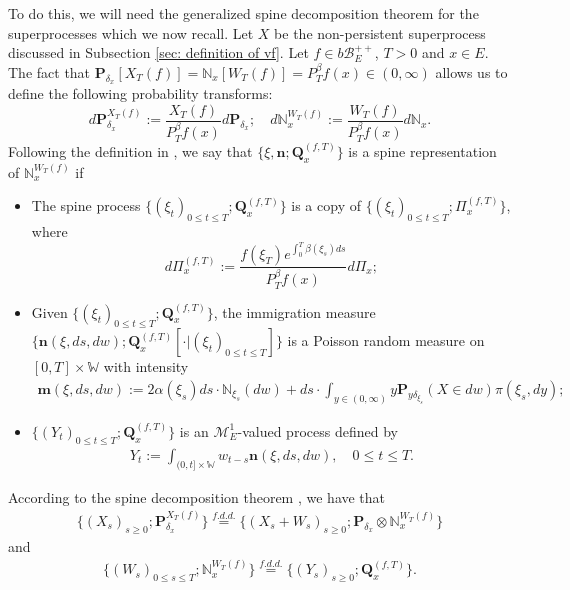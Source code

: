 \documentclass[12pt]{amsart}
\theoremstyle{plain}
\theoremstyle{definition}
\numberwithin{equation}{section}
\begin{document}
    To do this, we will need the generalized spine decomposition theorem for the superprocesses \cite{RenSongSun2017Spine} which we now recall.
    Let $X$ be the non-persistent superprocess discussed in Subsection \ref{sec: definition of vf}.
    Let $f\in b\mathscr B_E^{++}$, $T >0$ and $x\in E$.
    The fact that $\mathbf P_{\delta_x}[X_T(f)] = \mathbb N_x[W_T(f)] = P^\beta_T f(x) \in (0,\infty)$ allows us to define the following probability transforms:
\begin{equation}
    d\mathbf P_{\delta_x}^{X_T(f)}
    := \frac{X_T(f)}{P_T^\beta f(x)} d\mathbf P_{\delta_x};
    \quad d\mathbb N_x^{W_T(f)}
    :=  \frac{W_T(f)}{P_T^\beta f(x)} d\mathbb N_x.
\end{equation}
    Following the definition in \cite{RenSongSun2017Spine}, we say that $\{\xi, \mathbf n;\mathbf Q_{x}^{(f,T)}\}$ is a spine representation of $\mathbb N_x^{W_T(f)}$ if
\begin{itemize}
\item
    The spine process $\{(\xi_t)_{0\leq t\leq T}; \mathbf Q^{(f,T)}_x\}$ is a copy of $\{(\xi_t)_{0\leq t\leq T}; \Pi^{(f,T)}_{x}\}$,
    where
\begin{equation}
    d\Pi_x^{(f,T)} := \frac{f(\xi_T)e^{\int_0^T \beta(\xi_s)ds}}{P^\beta_T f(x)} d \Pi_x;
\end{equation}
\item
    Given $\{(\xi_t)_{0\leq t\leq T}; \mathbf Q^{(f,T)}_x\}$, the immigration measure $\{\mathbf n(\xi,ds,dw); \mathbf Q^{(f,T)}_x[\cdot |(\xi_t)_{0\leq t\leq T}]\}$ is a Poisson random measure on $[0,T] \times \mathbb W$ with intensity
\begin{align}
\label{eq: conditional intensity}
    \mathbf m(\xi,ds,dw)
    := 2 \alpha(\xi_s) ds \cdot \mathbb N_{\xi_s}(dw) + ds \cdot \int_{y\in (0,\infty)} y \mathbf P_{y\delta_{\xi_s}}(X\in dw) \pi(\xi_s,dy);
\end{align}
\item
    $\{(Y_t)_{0\leq t\leq T}; \mathbf Q^{(f,T)}_x\}$ is an $\mathcal M^1_E$-valued process defined by
\begin{align}
    Y_t
    := \int_{(0,t] \times \mathbb W} w_{t-s} \mathbf n(\xi,ds,dw),
    \quad 0 \leq t\leq T.
\end{align}
\end{itemize}
    According to the spine decomposition theorem \cite{RenSongSun2017Spine}, we have that
\begin{align}
\label{eq: Spine decomposition 1}
    \{(X_s)_{s \geq 0};\mathbf P_{\delta_x}^{X_T(f)}\}
    \overset{f.d.d.}{=} \{(X_s + W_s)_{s \geq 0};\mathbf P_{\delta_x} \otimes \mathbb N_x^{W_T(f)} \}
\end{align}
    and
\begin{align}
\label{eq: Spine decomposition 2}
    \{(W_s)_{0\leq s\leq T};\mathbb N_x^{W_T(f)}\}
    \overset{f.d.d.}{=} \{(Y_s)_{s \geq 0};\mathbf Q_x^{(f,T)}\}.
\end{align}
\end{document}

